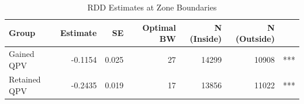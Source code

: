 \begin{table}

\caption{\label{tab:rdd}RDD Estimates at Zone Boundaries}
\centering
\begin{tabular}[t]{lrrrrrl}
\toprule
Group & Estimate & SE & Optimal BW & N (Inside) & N (Outside) & \\
\midrule
Gained QPV & -0.1154 & 0.025 & 27 & 14299 & 10908 & ***\\
Retained QPV & -0.2435 & 0.019 & 17 & 13856 & 11022 & ***\\
\bottomrule
\end{tabular}
\end{table}
